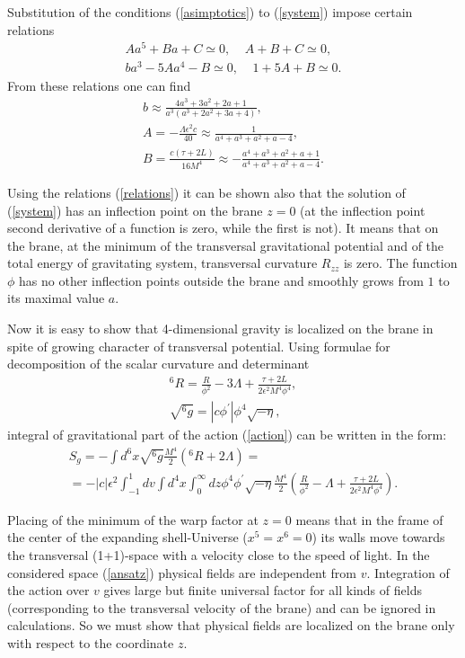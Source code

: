 \documentclass[a4paper,a4paper]{article}
\begin{document}
Substitution of the conditions (\ref{asimptotics}) to
(\ref{system}) impose certain relations
\begin{eqnarray} \label{relations}
Aa^5 + Ba + C \simeq 0,~~~~~A + B + C \simeq 0, \nonumber \\
b a^3 - 5Aa^4 - B \simeq 0,~~~~~1 + 5A + B \simeq 0.
\end{eqnarray}
From these relations one can find \cite{GoMi}
\begin{eqnarray} \label{values}
b \approx \frac{4a^3 + 3a^2 + 2a +1}{a^3(a^3 + 2a^2 + 3a + 4)},
\nonumber \\
A = -\frac{\Lambda \epsilon^2c}{40}\approx \frac{1}{a^4 + a^3 +
a^2 + a - 4}, \\
B = \frac{c(\tau + 2L)}{16 M^4} \approx - \frac{a^4+a^3 + a^2 + a
+1}{a^4 + a^3 + a^2 + a - 4}. \nonumber
\end{eqnarray}

Using the relations (\ref{relations}) it can be shown also that
the solution of (\ref{system}) has an inflection point on the
brane $z = 0$ (at the inflection point second derivative of a
function is zero, while the first is not). It means that on the
brane, at the minimum of the transversal gravitational potential
and of the total energy of gravitating system, transversal
curvature $R_{zz}$ is zero. The function $\phi $ has no other
inflection points outside the brane and smoothly grows from $1$ to
its maximal value $a$.

Now it is easy to show that 4-dimensional gravity is localized on
the brane in spite of growing character of transversal potential.
Using formulae for decomposition of the scalar curvature and
determinant
\begin{eqnarray} \label{6R}
^6R = \frac{R}{\phi^2} - 3 \Lambda +
\frac{\tau + 2L}{2\epsilon^2 M^4\phi^4} , \\
\sqrt{^6g} = |c\phi ^{'}|\phi^4\sqrt{-\eta} , \nonumber
\end{eqnarray}
integral of gravitational part of the action (\ref{action}) can be
written in the form:
\begin{eqnarray}  \label{integral1}
S_g = - \int d^6x\sqrt{^6g} \frac{M^4}{2}\left(^6R + 2
\Lambda\right) =  \nonumber \\ = - |c|\epsilon^2\int_{-1}^1dv\int
d^4x\int_0^\infty dz \phi^4
\phi^{'}\sqrt{-\eta}\frac{M^4}{2}\left(\frac{R}{\phi^2} -
\Lambda + \frac{\tau + 2L}{2\epsilon^2 M^4\phi^4}\right) .
\end{eqnarray}

Placing of the minimum of the warp factor at $z=0$ means that
in the frame of the center of the expanding shell-Universe
($x^5 = x^6 = 0$) its walls move towards the transversal
(1+1)-space with a velocity close to the speed of light. In the
considered space (\ref{ansatz}) physical fields are independent
from $v$. Integration of the action over $v$ gives large but finite
universal factor for all kinds of fields (corresponding to the
transversal velocity of the brane) and can be ignored in
calculations. So we must show that physical fields are localized on
the brane only with respect to the coordinate $z$.
\end{document}
